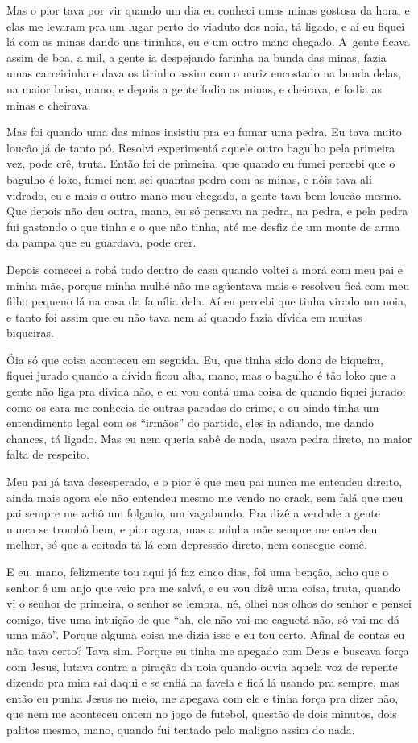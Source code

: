 Mas o pior tava por vir quando um dia eu conheci umas minas gostosa da
hora, e elas me levaram pra um lugar perto do viaduto dos noia, tá
ligado, e aí eu fiquei lá com as minas dando uns tirinhos, eu e um outro
mano chegado. A~gente ficava assim de boa, a mil, a gente ia despejando
farinha na bunda das minas, fazia umas carreirinha e dava os tirinho
assim com o nariz encostado na bunda delas, na maior brisa, mano, e
depois a gente fodia as minas, e cheirava, e fodia as minas e cheirava.

Mas foi quando uma das minas insistiu pra eu fumar uma pedra. Eu tava
muito loucão já de tanto pó. Resolvi experimentá aquele outro bagulho
pela primeira vez, pode crê, truta. Então foi de primeira, que quando eu
fumei percebi que o bagulho é loko, fumei nem sei quantas pedra com as
minas, e nóis tava ali vidrado, eu e mais o outro mano meu chegado, a
gente tava bem loucão mesmo. Que depois não deu outra, mano, eu só
pensava na pedra, na pedra, e pela pedra fui gastando o que tinha e o
que não tinha, até me desfiz de um monte de arma da pampa que eu
guardava, pode crer.

Depois comecei a robá tudo dentro de casa quando voltei a morá com meu
pai e minha mãe, porque minha mulhé não me agüentava mais e resolveu
ficá com meu filho pequeno lá na casa da família dela. Aí eu percebi que
tinha virado um noia, e tanto foi assim que eu não tava nem aí quando
fazia dívida em muitas biqueiras.

Óia só que coisa aconteceu em seguida. Eu, que tinha sido dono de
biqueira, fiquei jurado quando a dívida ficou alta, mano, mas o bagulho
é tão loko que a gente não liga pra dívida não, e eu vou contá uma coisa
de quando fiquei jurado: como os cara me conhecia de outras paradas do
crime, e eu ainda tinha um entendimento legal com os ``irmãos'' do
partido, eles ia adiando, me dando chances, tá ligado. Mas eu nem queria
sabê de nada, usava pedra direto, na maior falta de respeito.

Meu pai já tava desesperado, e o pior é que meu pai nunca me entendeu
direito, ainda mais agora ele não entendeu mesmo me vendo no crack, sem
falá que meu pai sempre me achô um folgado, um vagabundo. Pra dizê a
verdade a gente nunca se trombô bem, e pior agora, mas a minha mãe
sempre me entendeu melhor, só que a coitada tá lá com depressão direto,
nem consegue comê.

E eu, mano, felizmente tou aqui já faz cinco dias, foi uma benção, acho
que o senhor é um anjo que veio pra me salvá, e eu vou dizê uma coisa,
truta, quando vi o senhor de primeira, o senhor se lembra, né, olhei nos
olhos do senhor e pensei comigo, tive uma intuição de que ``ah, ele não
vai me caguetá não, só vai me dá uma mão''. Porque alguma coisa me dizia
isso e eu tou certo. Afinal de contas eu não tava certo? Tava sim.
Porque eu tinha me apegado com Deus e buscava força com Jesus, lutava
contra a piração da noia quando ouvia aquela voz de repente dizendo pra
mim saí daqui e se enfiá na favela e ficá lá usando pra sempre, mas
então eu punha Jesus no meio, me apegava com ele e tinha força pra dizer
não, que nem me aconteceu ontem no jogo de futebol, questão de dois
minutos, dois palitos mesmo, mano, quando fui tentado pelo maligno assim
do nada.

